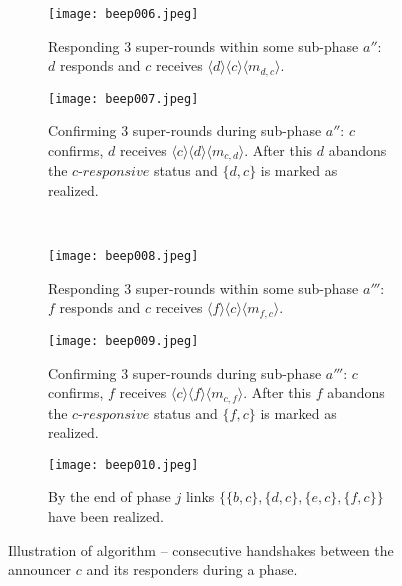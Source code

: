 \begin{figure}[thbp]
\begin{subfigure}[htbp]{0.30\textwidth}
\label{subfig:conf1}
\end{subfigure}
\hspace{0.1in}
\begin{subfigure}[htbp]{0.30\textwidth}
\centering
\vspace*{-8ex}
\texttt{[image: beep006.jpeg]}
\caption{Responding $3$ super-rounds within some sub-phase $a''$: $d$ responds and $c$ receives $\langle d\rangle\langle c\rangle\langle m_{d,c}\rangle$.}
\label{subfig:resp2}
\end{subfigure}
\hspace{0.1in}
\begin{subfigure}[htbp]{0.30\textwidth}
\centering
\vspace*{-3ex}
\texttt{[image: beep007.jpeg]}
\caption{Confirming $3$ super-rounds during sub-phase $a''$: $c$ confirms, $d$ receives $\langle c\rangle\langle d\rangle\langle m_{c,d}\rangle$. After this $d$ abandons the $c$-$responsive$ status and $\{d,c\}$ is marked as realized.}
\label{subfig:conf2}
\end{subfigure}
\\
\begin{subfigure}[htbp]{0.30\textwidth}
\centering
\texttt{[image: beep008.jpeg]}
\caption{Responding $3$ super-rounds within some sub-phase $a'''$: $f$ responds and $c$ receives $\langle f\rangle\langle c\rangle\langle m_{f,c}\rangle$.}
\label{subfig:resp3}
\end{subfigure}
\hspace{0.1in}
\begin{subfigure}[htbp]{0.30\textwidth}
\centering
\vspace*{5ex}
\texttt{[image: beep009.jpeg]}
\caption{Confirming $3$ super-rounds during sub-phase $a'''$: $c$ confirms, $f$ receives $\langle c\rangle\langle f\rangle\langle m_{c,f}\rangle$. After this $f$ abandons the $c$-$responsive$ status and $\{f,c\}$ is marked as realized.}
\label{subfig:conf3}
\end{subfigure}
\hspace{0.1in}
\begin{subfigure}[htbp]{0.30\textwidth}
\centering
\texttt{[image: beep010.jpeg]}
\caption{By the end of phase $j$ links $\{\{b,c\},\{d,c\},\{e,c\},\{f,c\}\}$ have been realized.}
\label{subfig:end}
\end{subfigure}
\caption{Illustration of \alg algorithm -- consecutive handshakes between the announcer $c$ and its responders during a phase.}
\label{fig:alg}
\end{figure}


